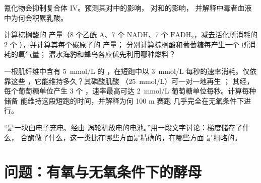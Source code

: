 \begin{exercise}[$\star\star$]\label{exo:b1:respiration-fermentation:9}
氰化物会抑制复合体 IV。预测其对中的影响，
对和的影响，
并解释中毒者血液中为何会积累乳酸。
\end{exercise}

\begin{exercise}[$\star\star\star$]\label{exo:b1:respiration-fermentation:10}
计算棕榈酸的  产量（8 个乙酰 A、7 个 NADH、7 个
$\mathrm{FADH_2}$，减去活化所消耗的 2 个 ），并计算其每个碳原子的  产量；
分别计算棕榈酸和葡萄糖每产生一个  所消耗的氧气量；
潜水海豹和蜂鸟各应优先利用哪种燃料？
\end{exercise}

\begin{exercise}[$\star\star\star$]\label{exo:b1:respiration-fermentation:11}
一根肌纤维中含有 \qty{5}{mmol/L} 的 ，在短跑中以 \qty{3}{mmol/L}
每秒的速率消耗。仅依靠这些 ，它能维持多久？其磷酸肌酸
（\qty{25}{mmol/L}）可一对一地再生 ；
其经，每个葡萄糖单位产生 3 个 ，速率最高可达
\qty{2}{mmol/L} 葡萄糖单位每秒。计算每种储备
能维持这段短跑的时间，并解释为何 100 m 赛跑
几乎完全在无氧条件下进行。
\end{exercise}

\begin{exercise}[$\star\star\star$]\label{exo:b1:respiration-fermentation:12}
“是一块由电子充电、经由
涡轮机放电的电池。”用一段文字讨论：梯度储存了什么，
合酶做了什么，这一类比在哪些方面是精确的，在哪些方面
是粗略的。
\end{exercise}

\section{问题：有氧与无氧条件下的酵母}

